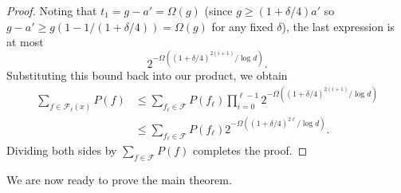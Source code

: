\documentclass{amsart}
\theoremstyle{definition}
\newcommand{\gd}[0]{\delta }
\newcommand{\0}[0]{\emptyset}
\begin{document}
\begin{proof}
Noting that $t_1=g-a'=\Omega(g)$ (since $g \ge (1+\gd/4)a'$ so $g-a' \ge g(1-1/(1+\gd/4))=\Omega(g)$ for any fixed $\delta$), the last expression is at most
\[2^{-\Omega((1+\delta/4)^{2(i+1)}/\log d)}.\]
Substituting this bound back into our product, we obtain
\begin{align*}
    \sum_{f\in\mathcal{F}_{\ell}(x)}P(f) 
    &\leq \sum_{f_\ell\in \mathcal{F}}P(f_\ell)\prod_{i=0}^{\ell-1}2^{-\Omega((1+\delta/4)^{2(i+1)}/\log d)}\\
    &\leq \sum_{f_\ell\in \mathcal{F}}P(f_\ell) 2^{-\Omega((1+\delta/4)^{2\ell}/\log d)}.
\end{align*}
Dividing both sides by $\sum_{f\in\mathcal{F}}P(f)$ completes the proof.
\end{proof}


We are now ready to prove the main theorem.
\end{document}

